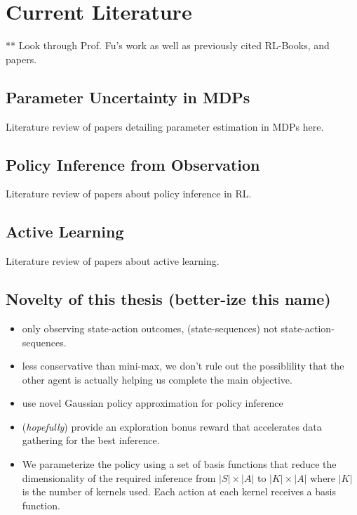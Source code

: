 
\section{Current Literature}
    ** Look through Prof. Fu's work as well as previously cited RL-Books, and papers.

\subsection{Parameter Uncertainty in MDPs}
    Literature review of papers detailing parameter estimation in MDPs here.

\subsection{Policy Inference from Observation}
    Literature review of papers about policy inference in RL.

\subsection{Active Learning}
    Literature review of papers about active learning.

\subsection{Novelty of this thesis (better-ize this name)}
    \begin{itemize}
        \item only observing state-action outcomes, (state-sequences) not state-action-sequences.
        \item less conservative than mini-max, we don't rule out the possiblility that the other agent is actually
            helping us complete the main objective.
        \item use novel Gaussian policy approximation for policy inference
        \item (\textit{hopefully}) provide an exploration bonus reward that accelerates data gathering for the best
            inference.
        \item We parameterize the policy using a set of basis functions that reduce the dimensionality of the required
            inference from $|S|\times|A|$ to $|K|\times|A|$ where $|K|$ is the number of kernels used. Each action at
            each kernel receives a basis function.
    \end{itemize}
